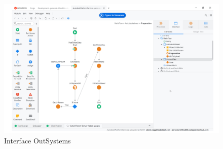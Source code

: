 \begin{figure}[H]
    \centering
    \includegraphics[width=15cm]{Figures/outsystems.png}
    \caption{Interface OutSystems}
    \label{fig:my_label} %
\end{figure}

